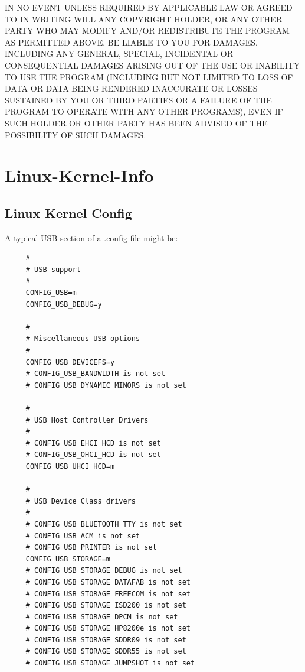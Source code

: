 {{{{{{{{{{{{{{{IN NO EVENT UNLESS REQUIRED BY APPLICABLE LAW OR AGREED TO IN WRITING WILL ANY
COPYRIGHT HOLDER, OR ANY OTHER PARTY WHO MAY MODIFY AND/OR REDISTRIBUTE THE
PROGRAM AS PERMITTED ABOVE, BE LIABLE TO YOU FOR DAMAGES, INCLUDING ANY
GENERAL, SPECIAL, INCIDENTAL OR CONSEQUENTIAL DAMAGES ARISING OUT OF THE USE
OR INABILITY TO USE THE PROGRAM (INCLUDING BUT NOT LIMITED TO LOSS OF DATA OR
DATA BEING RENDERED INACCURATE OR LOSSES SUSTAINED BY YOU OR THIRD PARTIES OR
A FAILURE OF THE PROGRAM TO OPERATE WITH ANY OTHER PROGRAMS), EVEN IF SUCH
HOLDER OR OTHER PARTY HAS BEEN ADVISED OF THE POSSIBILITY OF SUCH DAMAGES. 

\label{Linux-Kernel-Info}
\section*{Linux-Kernel-Info}

\subsection*{Linux Kernel Config}
\label{Linux-Kernel-Config}

A typical USB section of a .config file might be:  

\label{index-Kernel-config-265}
\label{index-config_002c-Kernel-266}

\footnotesize
\begin{verbatim}
     #
     # USB support
     #
     CONFIG_USB=m
     CONFIG_USB_DEBUG=y
     
     #
     # Miscellaneous USB options
     #
     CONFIG_USB_DEVICEFS=y
     # CONFIG_USB_BANDWIDTH is not set
     # CONFIG_USB_DYNAMIC_MINORS is not set
     
     #
     # USB Host Controller Drivers
     #
     # CONFIG_USB_EHCI_HCD is not set
     # CONFIG_USB_OHCI_HCD is not set
     CONFIG_USB_UHCI_HCD=m
     
     #
     # USB Device Class drivers
     #
     # CONFIG_USB_BLUETOOTH_TTY is not set
     # CONFIG_USB_ACM is not set
     # CONFIG_USB_PRINTER is not set
     CONFIG_USB_STORAGE=m
     # CONFIG_USB_STORAGE_DEBUG is not set
     # CONFIG_USB_STORAGE_DATAFAB is not set
     # CONFIG_USB_STORAGE_FREECOM is not set
     # CONFIG_USB_STORAGE_ISD200 is not set
     # CONFIG_USB_STORAGE_DPCM is not set
     # CONFIG_USB_STORAGE_HP8200e is not set
     # CONFIG_USB_STORAGE_SDDR09 is not set
     # CONFIG_USB_STORAGE_SDDR55 is not set
     # CONFIG_USB_STORAGE_JUMPSHOT is not set
     

\end{verbatim}}}}}}}}}}}}}}}}
